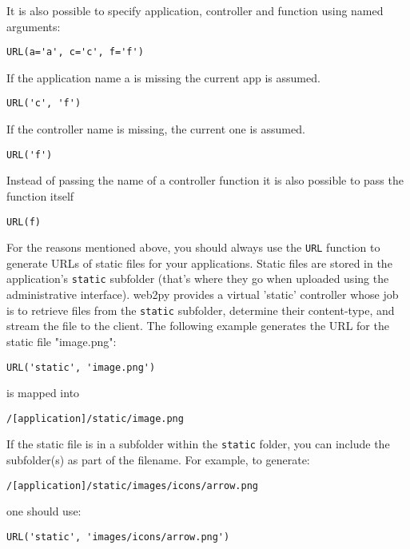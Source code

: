 \documentclass[justified,sixbynine,notoc]{tufte-book}
\def\ft{\small\tt}
\begin{document}
\begin{fullwidth}
It is also possible to specify application, controller and function using named arguments:

\begin{lstlisting}
URL(a='a', c='c', f='f')
\end{lstlisting}

If the application name a is missing the current app is assumed.

\begin{lstlisting}
URL('c', 'f')
\end{lstlisting}

If the controller name is missing, the current one is assumed.

\begin{lstlisting}
URL('f')
\end{lstlisting}

Instead of passing the name of a controller function it is also possible to pass the function itself

\begin{lstlisting}
URL(f)
\end{lstlisting}

For the reasons mentioned above, you should always use the {\ft URL} function to generate URLs of static files for your applications. Static files are stored in the application's {\ft static} subfolder (that's where they go when uploaded using the administrative interface). web2py provides a virtual 'static' controller whose job is to retrieve files from the {\ft static} subfolder, determine their content-type, and stream the file to the client. The following example generates the URL for the static file "image.png":

\begin{lstlisting}
URL('static', 'image.png')
\end{lstlisting}
\noindent is mapped into

\begin{lstlisting}
/[application]/static/image.png
\end{lstlisting}

If the static file is in a subfolder within the {\ft static} folder, you can include the subfolder(s) as part of the filename. For example, to generate:

\begin{lstlisting}
/[application]/static/images/icons/arrow.png
\end{lstlisting}
\noindent one should use:

\begin{lstlisting}
URL('static', 'images/icons/arrow.png')
\end{lstlisting}


\end{fullwidth}
\end{document}
